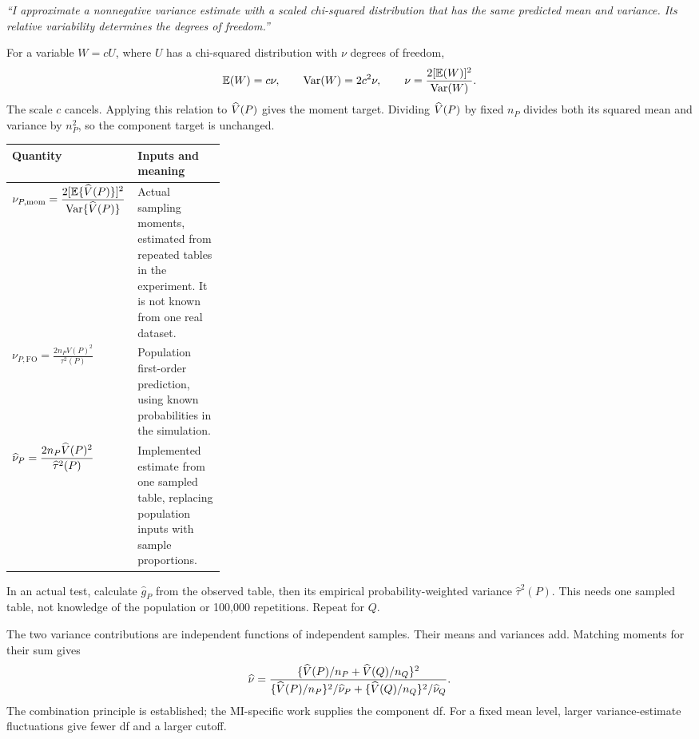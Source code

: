 
\newpage
{}

\emph{``I approximate a nonnegative variance estimate with a scaled chi-squared distribution that has the same predicted mean and variance. Its relative variability determines the degrees of freedom.''}

For a variable \(W=cU\), where \(U\) has a chi-squared distribution with \(\nu\) degrees of freedom,
\[
\mathbb E(W)=c\nu,\qquad\operatorname{Var}(W)=2c^2\nu,
\qquad \nu=\frac{2[\mathbb E(W)]^2}{\operatorname{Var}(W)}.
\]
The scale \(c\) cancels. Applying this relation to \(\widehat V(P)\) gives the moment target. Dividing \(\widehat V(P)\) by fixed \(n_P\) divides both its squared mean and variance by \(n_P^2\), so the component target is unchanged.

\begin{tabularx}{\linewidth}{@{}p{0.31\linewidth}X@{}}
\toprule
\textbf{Quantity} & \textbf{Inputs and meaning}\\
\midrule
\(\displaystyle\nu_{P,\mathrm{mom}}=\frac{2[\mathbb E\{\widehat V(P)\}]^2}{\operatorname{Var}\{\widehat V(P)\}}\) & Actual sampling moments, estimated from repeated tables in the experiment. It is not known from one real dataset.\\[5pt]
\(\displaystyle\nu_{P,\mathrm{FO}}=\frac{2n_PV(P)^2}{\tau^2(P)}\) & Population first-order prediction, using known probabilities in the simulation.\\[5pt]
\(\displaystyle\widehat\nu_P=\frac{2n_P\widehat V(P)^2}{\widehat\tau^2(P)}\) & Implemented estimate from one sampled table, replacing population inputs with sample proportions.\\
\bottomrule
\end{tabularx}

In an actual test, calculate \(\widehat g_P\) from the observed table, then its empirical probability-weighted variance \(\widehat\tau^2(P)\). This needs one sampled table, not knowledge of the population or 100,000 repetitions. Repeat for \(Q\).

The two variance contributions are independent functions of independent samples. Their means and variances add. Matching moments for their sum gives
\[
\widehat\nu=
\frac{\{\widehat V(P)/n_P+\widehat V(Q)/n_Q\}^2}
{\{\widehat V(P)/n_P\}^2/\widehat\nu_P+
 \{\widehat V(Q)/n_Q\}^2/\widehat\nu_Q}.
\]
The combination principle is established; the MI-specific work supplies the component df. For a fixed mean level, larger variance-estimate fluctuations give fewer df and a larger cutoff.

